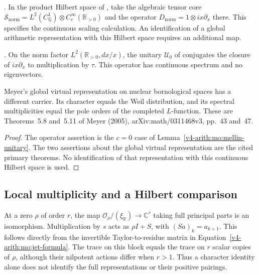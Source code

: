 \begin{definition}
\label{v4-arith:w9-r4:def:meyer-data}
\ClaimStatusDefinitional. In the product Hilbert space of
, take the algebraic
tensor core
$\mathcal S_{\mathrm{norm}}=L^2(C_{\mathbb Q}^1)\otimes
C_c^\infty(\mathbb R_{>0})$ and the operator
$D_{\mathrm{norm}}=1\otimes ix\partial_x$ there.
This specifies the continuous scaling calculation.
An identification of a global arithmetic representation with
this Hilbert space requires an additional map.
\end{definition}

\begin{theorem}
\label{v4-arith:w9-r4:thm:meyer-intertwiner}
\ClaimStatusProvedHere. On the norm factor
$L^2(\mathbb R_{>0},dx/x)$, the unitary $\mathcal U_0$ of
 conjugates the closure
of $ix\partial_x$ to multiplication by $\tau$.
This operator has continuous spectrum and no eigenvectors.

Meyer's global virtual representation on nuclear bornological
spaces has a different carrier. Its character equals the Weil
distribution, and its spectral multiplicities equal the pole
orders of the completed $L$-function. These are Theorems~5.8
and~5.11 of Meyer (2005), arXiv:math/0311468v3, pp.~43 and~47.
\end{theorem}
\begin{proof}
The operator assertion is the $c=0$ case of
Lemma~\ref{v4-arith:mo:mellin-unitary}. The two assertions about the
global virtual representation are the cited primary theorems.
No identification of that representation with this continuous
Hilbert space is used.
\end{proof}

\subsection{Local multiplicity and a Hilbert comparison}
\label{v4-arith:w9-r4:meyer-2005:limitation}

\begin{remark}
\label{v4-arith:w9-r4:rem:meyer-not-A}
At a zero $\rho$ of order $r$, the map
$\mathcal O_\rho/(\xi_{\mathbb R})\to\mathbb C^r$ taking full
principal parts is an isomorphism. Multiplication by $s$ acts
as $\rho I+S$, with $(Sa)_k=a_{k+1}$.
This follows directly from the invertible Taylor-to-residue
matrix in Equation~\eqref{v4-arith:mo:jet-formula}.
The trace on this block equals the trace on $r$ scalar copies
of $\rho$, although their nilpotent actions differ when $r>1$.
Thus a character identity alone does not identify the full
representations or their positive pairings.
\end{remark}

